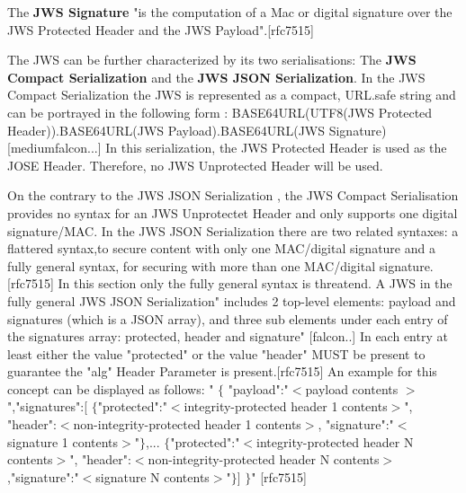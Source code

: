 The \textbf{JWS Signature} "is the computation of a Mac or digital signature over the JWS Protected Header and the JWS Payload".[rfc7515]\newline 

The JWS can be further characterized by its two serialisations: The \textbf{JWS Compact Serialization} and the \textbf{JWS JSON Serialization}. 
In the JWS Compact Serialization the JWS is represented as a compact, URL.safe string and can be portrayed in the following form :\newline    
BASE64URL(UTF8(JWS Protected Header)).BASE64URL(JWS Payload).BASE64URL(JWS Signature) [mediumfalcon...]
In this serialization, the JWS Protected Header is used as the JOSE Header. Therefore, no JWS Unprotected Header will be used.

On the contrary to the JWS JSON Serialization , the JWS Compact Serialisation provides no syntax for an JWS Unprotectet Header and only supports one digital signature/MAC.
In the JWS JSON Serialization there are two related syntaxes: a flattered syntax,to secure content with only one MAC/digital signature and a fully general syntax, for securing with more than one MAC/digital signature.[rfc7515] In this section only the fully general syntax is threatend. 
A JWS in the fully general JWS JSON Serialization" includes 2 top-level elements: payload and signatures (which is a JSON array), and three sub elements under each entry of the signatures array: protected, header and signature" [falcon..]
In each entry at least either the value "protected" or the value "header" MUST be present to guarantee the "alg" Header Parameter is present.[rfc7515]\newline
An example for this concept can be displayed as follows:\newline 
	" $\{$ "payload":"$<$payload contents $>$",\newline    "signatures":[\newline
   $\{$"protected":"$<$integrity-protected header 1 contents$>$",\newline
   "header":$<$non-integrity-protected header 1 contents$>$, \newline
   "signature":"$<$signature 1 contents$>$"$\}$,\newline ...\newline
   $\{$"protected":"$<$integrity-protected header N contents$>$",\newline
   "header":$<$non-integrity-protected header N contents$>$,\newline"signature":"$<$signature N contents$>$"$\}$] \newline    $\}$" [rfc7515]

